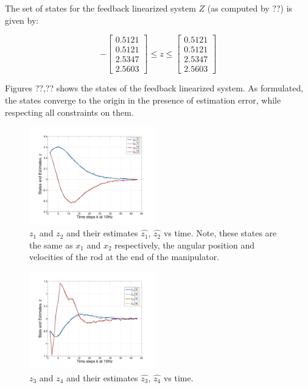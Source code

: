 The set of states for the feedback linearized system $Z$ (as computed by ??) is given by:

\begin{equation}
 -\begin{bmatrix} 0.5121  \\ 0.5121  \\ 2.5347 \\ 2.5603 \end{bmatrix} \leq z \leq \begin{bmatrix} 0.5121  \\ 0.5121  \\ 2.5347 \\ 2.5603 \end{bmatrix}
\end{equation}

Figures ??,?? shows the states of the feedback linearized system. As formulated, the states converge to the origin in the presence of estimation error, while respecting all constraints on them.

\begin{figure}
\includegraphics[width=0.49\textwidth]{figs/z_1n2_manip.pdf}
\caption{$z_1$ and $z_2$ and their estimates $\hat{z_1}, \, \hat{z_2}$ vs time. Note, these states are the same as $x_1$ and $x_2$ respectively, the angular position and velocities of the rod at the end of the manipulator.}
\label{fig:z_12}
\end{figure}

\begin{figure}
\includegraphics[width=0.49\textwidth]{figs/z_3n4_manip.pdf}
\caption{$z_3$ and $z_4$ and their estimates $\hat{z_3}, \, \hat{z_4}$ vs time. }
\label{fig:z_34}
\end{figure}

